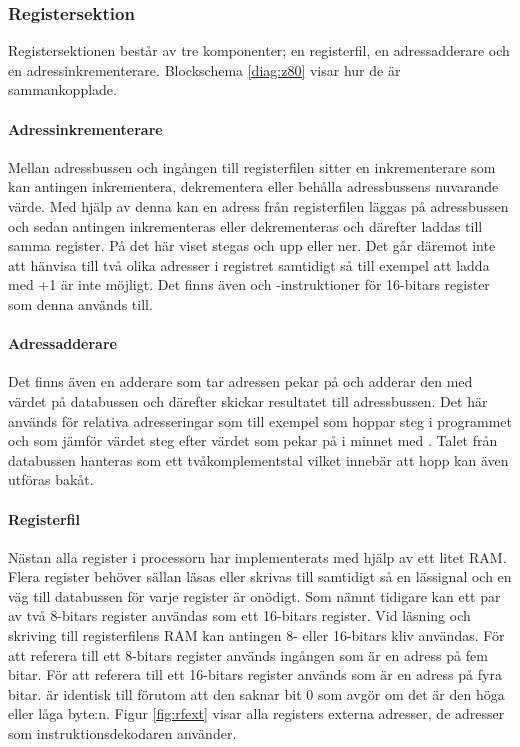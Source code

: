 \documentclass[main.tex]{subfiles}
\begin{document}
\subsubsection{Registersektion}
Registersektionen består av tre komponenter; en registerfil, en
adressadderare och en adressinkrementerare. Blockschema \ref{diag:z80} visar
hur de är sammankopplade.

\paragraph{Adressinkrementerare}
Mellan adressbussen och ingången till registerfilen sitter en inkrementerare
som kan antingen inkrementera, dekrementera eller behålla adressbussens
nuvarande värde. Med hjälp av denna kan en adress från registerfilen läggas på
adressbussen och sedan antingen inkrementeras eller dekrementeras och därefter
laddas till samma register. På det här viset stegas  och  upp
eller ner. Det går däremot inte att hänvisa till två olika adresser i registret
samtidigt så till exempel att ladda  med +1 är inte möjligt.
Det finns även  och -instruktioner för 16-bitars register
som denna används till.

\paragraph{Adressadderare}
Det finns även en adderare som tar adressen  pekar på och adderar
den med värdet på databussen och därefter skickar resultatet till adressbussen.
Det här används för relativa adresseringar som till exempel  som
hoppar  steg i programmet och  som jämför värdet
 steg efter värdet som  pekar på i minnet med . Talet
från databussen hanteras som ett tvåkomplementstal vilket innebär att hopp kan
även utföras bakåt.

\paragraph{Registerfil}
Nästan alla register i processorn har implementerats med hjälp av ett litet
RAM. Flera register behöver sällan läsas eller skrivas till samtidigt så en
lässignal och en väg till databussen för varje register är onödigt. Som nämnt
tidigare kan ett par av två 8-bitars register användas som ett 16-bitars
register. Vid läsning och skriving till registerfilens RAM kan antingen 8-
eller 16-bitars kliv användas. För att referera till ett 8-bitars register
används ingången  som är en adress på fem bitar. För att referera
till ett 16-bitars register används  som är en adress på fyra
bitar.  är identisk till  förutom att den saknar bit 0
som avgör om det är den höga eller låga byte:n. Figur \ref{fig:rfext} visar
alla registers externa adresser, de adresser som instruktionsdekodaren
använder.
\end{document}
